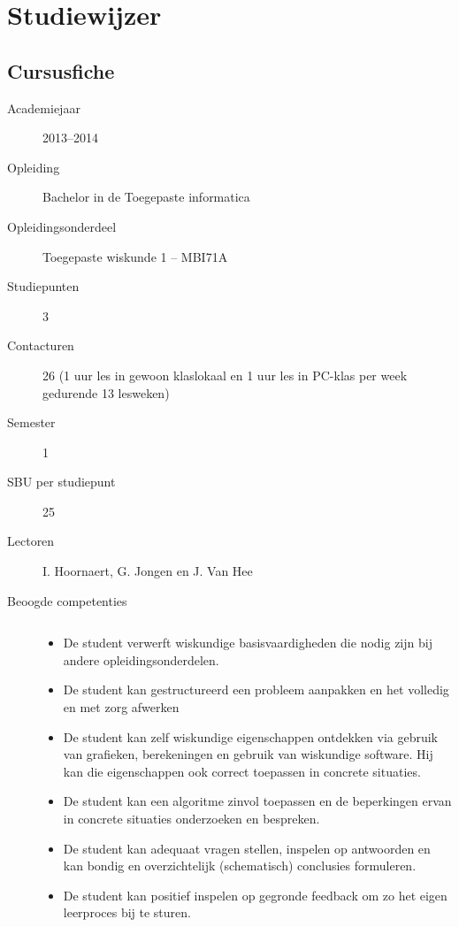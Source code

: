 %
%

\chapter*{Studiewijzer}


\section*{Cursusfiche}
\begin{description}
\item[Academiejaar]2013--2014
\item[Opleiding]Bachelor in de Toegepaste informatica
\item[Opleidingsonderdeel]Toegepaste wiskunde 1 -- MBI71A
\item[Studiepunten]3
\item[Contacturen]26  (1 uur les in gewoon klaslokaal en 1 uur les in PC-klas per week gedurende 13 lesweken)	
\item[Semester]	1 
\item[SBU per studiepunt]	25
\item[Lectoren]I. Hoornaert, G. Jongen en J. Van Hee
\item[Beoogde competenties]$\qquad$

\begin{itemize}
\item De student verwerft wiskundige basisvaardigheden die nodig zijn bij andere opleidingsonderdelen.
\item De student kan gestructureerd een probleem aanpakken en het volledig en met zorg afwerken
\item De student kan zelf wiskundige eigenschappen ontdekken via gebruik van grafieken, berekeningen en gebruik van wiskundige software. Hij kan die eigenschappen ook correct toepassen in concrete situaties.
\item De student kan een algoritme zinvol toepassen en de beperkingen ervan in concrete situaties onderzoeken en bespreken.
\item De student kan adequaat vragen stellen, inspelen op antwoorden en kan bondig en overzichtelijk (schematisch) conclusies formuleren.
\item De student kan positief inspelen op gegronde feedback om zo het eigen leerproces bij te sturen. 
\end{itemize}


\end{description}
